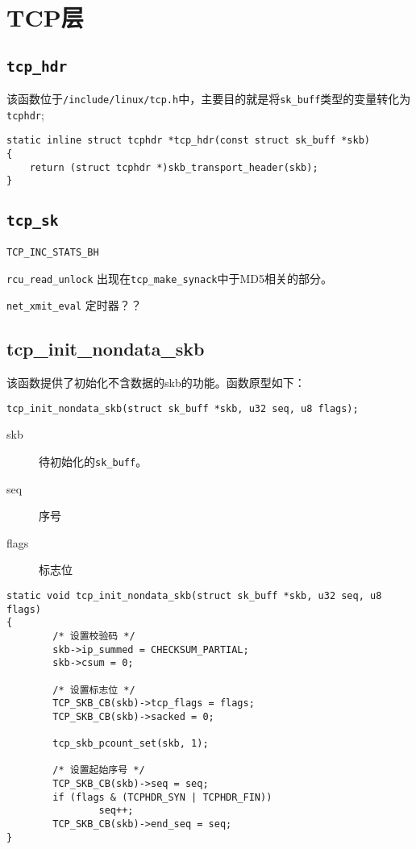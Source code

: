 \section{TCP层}
    \subsection{\texttt{tcp_hdr}}

        该函数位于\texttt{/include/linux/tcp.h}中，主要目的就是将\texttt{sk_buff}类型的变量转化为\texttt{tcphdr};
\begin{verbatim}
static inline struct tcphdr *tcp_hdr(const struct sk_buff *skb)
{
    return (struct tcphdr *)skb_transport_header(skb);
}
\end{verbatim}

	\subsection{\texttt{tcp_sk}}

    \texttt{TCP_INC_STATS_BH}

    \texttt{rcu_read_unlock} 出现在\texttt{tcp_make_synack}中于MD5相关的部分。
    
    \texttt{net_xmit_eval}   定时器？？
\subsection{tcp\_init\_nondata\_skb}
该函数提供了初始化不含数据的skb的功能。函数原型如下：
\begin{verbatim}
tcp_init_nondata_skb(struct sk_buff *skb, u32 seq, u8 flags);
\end{verbatim}

\begin{description}
  \item[skb] 待初始化的\texttt{sk_buff}。
  \item[seq] 序号
  \item[flags] 标志位
\end{description}

\begin{verbatim}
static void tcp_init_nondata_skb(struct sk_buff *skb, u32 seq, u8 flags)
{
        /* 设置校验码 */
        skb->ip_summed = CHECKSUM_PARTIAL;
        skb->csum = 0;

        /* 设置标志位 */
        TCP_SKB_CB(skb)->tcp_flags = flags;
        TCP_SKB_CB(skb)->sacked = 0;

        tcp_skb_pcount_set(skb, 1);

        /* 设置起始序号 */
        TCP_SKB_CB(skb)->seq = seq;
        if (flags & (TCPHDR_SYN | TCPHDR_FIN))
                seq++;
        TCP_SKB_CB(skb)->end_seq = seq;
}
\end{verbatim}

